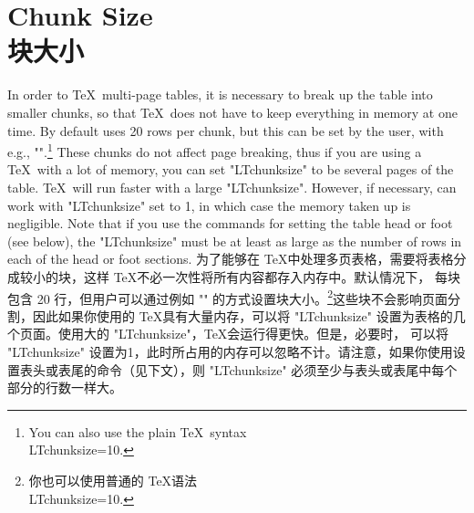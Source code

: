 
\section{Chunk Size\\块大小}

\begin{paracol}{2}
In order to \TeX\ multi-page tables, it is necessary to break up the
table into smaller chunks, so that \TeX\ does  not have to keep
everything in memory at one time. By default  uses 20
rows per chunk, but this can be set by the user, with e.g.,
"\setcounter{LTchunksize}{10}".\footnote
   {You can also use the plain \TeX\ syntax
   {\ttfamily\v\\LTchunksize=10.}}
These chunks do not affect page breaking,
thus if you are using a \TeX\ with a lot of memory, you can set
"LTchunksize" to be several pages of the table. \TeX\ will run
faster with a large "LTchunksize". However, if necessary,
 can work with "LTchunksize" set to 1, in which case
the memory taken up is negligible.
Note that if you use the commands for setting the table head or foot
(see below), the "LTchunksize" must be at least  as large as the
number of rows in each of the head or foot sections.
\switchcolumn
{}
为了能够在 \TeX 中处理多页表格，需要将表格分成较小的块，这样 \TeX 不必一次性将所有内容都存入内存中。默认情况下， 每块包含 20 行，但用户可以通过例如 "\setcounter{LTchunksize}{10}" 的方式设置块大小。\footnote{你也可以使用普通的 \TeX 语法 {\ttfamily\v\\LTchunksize=10.}}这些块不会影响页面分割，因此如果你使用的 \TeX 具有大量内存，可以将 "LTchunksize" 设置为表格的几个页面。使用大的 "LTchunksize"，\TeX 会运行得更快。但是，必要时， 可以将 "LTchunksize" 设置为1，此时所占用的内存可以忽略不计。请注意，如果你使用设置表头或表尾的命令（见下文），则 "LTchunksize" 必须至少与表头或表尾中每个部分的行数一样大。


\end{paracol}

